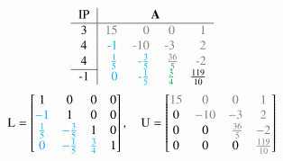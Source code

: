\documentclass[10pt,a4paper]{article}
\begin{document}
	\begin{align*}
		\begin{tabular}{c|rrrr}
			IP &                                                     \multicolumn{4}{c}{\textbf{A}}                                                      \\ \hline
			3  &                   \textcolor{gray}{15} &                 \textcolor{gray}{0} &                \textcolor{gray}{0} & \textcolor{gray}{1} \\
			4  &            \textcolor{ProcessBlue}{-1} &               \textcolor{gray}{-10} &               \textcolor{gray}{-3} & \textcolor{gray}{2} \\
			4  & \textcolor{ProcessBlue}{$\frac{1}{5}$} & \textcolor{ProcessBlue}{-$\frac{3}{5}$} & \textcolor{gray}{$\frac{36}{5}$}\hspace{-0.1cm} & \textcolor{gray}{-2} \\ \cline{1-1}
			-1  &             \textcolor{ProcessBlue}{0} &   \textcolor{ProcessBlue}{-$\frac{1}{5}$} &                     $\textcolor{Green}{\frac{3}{4}}$ &      $\frac{119}{10}$
		\end{tabular}
	\end{align*}
	\begin{align*}
		\text{L}=
		\begin{bmatrix}
			1                                    & 0                                     & 0                                    & 0 \\
			\textcolor{ProcessBlue}{-1}          & 1                                     & 0                                    & 0 \\
			\textcolor{ProcessBlue}{\frac{1}{5}} & \textcolor{ProcessBlue}{-\frac{3}{5}} & 1                                    & 0 \\
			\textcolor{ProcessBlue}{0}           & \textcolor{ProcessBlue}{-\frac{1}{5}} & \textcolor{ProcessBlue}{\frac{3}{4}} & 1
		\end{bmatrix}
			,\quad
		\text{U}=
		\begin{bmatrix}
			\textcolor{gray}{15} & \textcolor{gray}{0}   & \textcolor{gray}{0}                           & \textcolor{gray}{1}  \\
			0                    & \textcolor{gray}{-10} & \textcolor{gray}{-3}                          & \textcolor{gray}{2}  \\
			0                    & 0                     & \textcolor{gray}{\frac{36}{5}}\hspace{-0.1cm} & \textcolor{gray}{-2} \\
			0                    & 0                     & 0                                             & \textcolor{gray}{\frac{119}{10}}
		\end{bmatrix}
	\end{align*}
\end{document}
